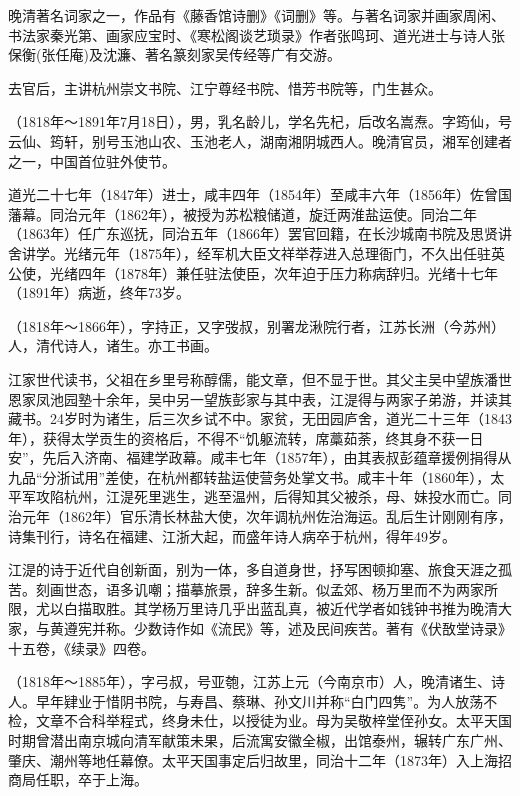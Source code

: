 \begin{description}
        晚清著名词家之一，作品有《藤香馆诗删》《词删》等。与著名词家并画家周闲、书法家秦光第、画家应宝时、《寒松阁谈艺琐录》作者张鸣珂、道光进士与诗人张保衡(张任庵)及沈濂、著名篆刻家吴传经等广有交游。\par
        去官后，主讲杭州崇文书院、江宁尊经书院、惜芳书院等，门生甚众。
  \item[郭嵩焘] （1818年～1891年7月18日），男，乳名龄儿，学名先杞，后改名嵩焘。字筠仙，号云仙、筠轩，别号玉池山农、玉池老人，湖南湘阴城西人。晚清官员，湘军创建者之一，中国首位驻外使节。\par
        道光二十七年（1847年）进士，咸丰四年（1854年）至咸丰六年（1856年）佐曾国藩幕。同治元年（1862年），被授为苏松粮储道，旋迁两淮盐运使。同治二年（1863年）任广东巡抚，同治五年（1866年）罢官回籍，在长沙城南书院及思贤讲舍讲学。光绪元年（1875年），经军机大臣文祥举荐进入总理衙门，不久出任驻英公使，光绪四年（1878年）兼任驻法使臣，次年迫于压力称病辞归。光绪十七年（1891年）病逝，终年73岁。
  \item[江湜] （1818年～1866年），字持正，又字弢叔，别署龙湫院行者，江苏长洲（今苏州）人，清代诗人，诸生。亦工书画。\par
        江家世代读书，父祖在乡里号称醇儒，能文章，但不显于世。其父主吴中望族潘世恩家凤池园塾十余年，吴中另一望族彭家与其中表，江湜得与两家子弟游，并读其藏书。24岁时为诸生，后三次乡试不中。家贫，无田园庐舍，道光二十三年（1843年），获得太学贡生的资格后，不得不“饥躯流转，席藁茹荼，终其身不获一日安”，先后入济南、福建学政幕。咸丰七年（1857年），由其表叔彭蕴章援例捐得从九品“分浙试用”差使，在杭州都转盐运使营务处掌文书。咸丰十年（1860年），太平军攻陷杭州，江湜死里逃生，逃至温州，后得知其父被杀，母、妹投水而亡。同治元年（1862年）官乐清长林盐大使，次年调杭州佐治海运。乱后生计刚刚有序，诗集刊行，诗名在福建、江浙大起，而盛年诗人病卒于杭州，得年49岁。\par
        江湜的诗于近代自创新面，别为一体，多自道身世，抒写困顿抑塞、旅食天涯之孤苦。刻画世态，语多讥嘲；描摹旅景，辞多生新。似孟郊、杨万里而不为两家所限，尤以白描取胜。其学杨万里诗几乎出蓝乱真，被近代学者如钱钟书推为晚清大家，与黄遵宪并称。少数诗作如《流民》等，述及民间疾苦。著有《伏敔堂诗录》十五卷，《续录》四卷。
  \item[金和] （1818年～1885年），字弓叔，号亚匏，江苏上元（今南京市）人，晚清诸生、诗人。早年肄业于惜阴书院，与寿昌、蔡琳、孙文川并称“白门四隽”。为人放荡不检，文章不合科举程式，终身未仕，以授徒为业。母为吴敬梓堂侄孙女。太平天国时期曾潜出南京城向清军献策未果，后流寓安徽全椒，出馆泰州，辗转广东广州、肇庆、潮州等地任幕僚。太平天国事定后归故里，同治十二年（1873年）入上海招商局任职，卒于上海。\par

\end{description}
